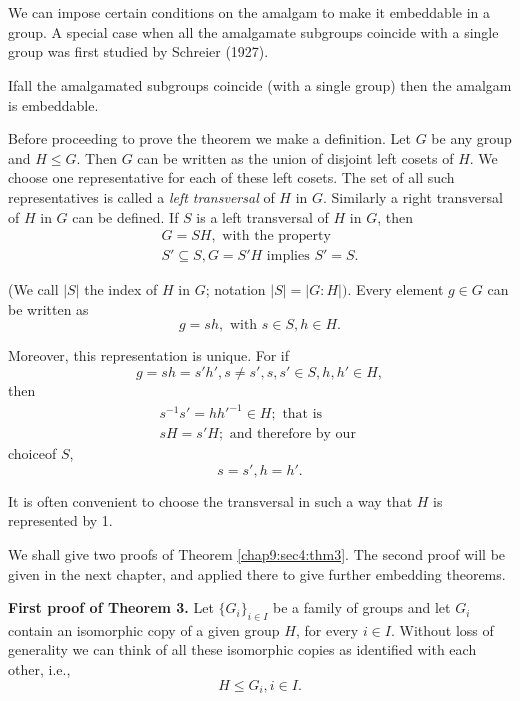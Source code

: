 \section{}\label{chap9:sec4}%

We can impose certain conditions on the amalgam to make it embeddable
in a group. A special case when all the amalgamate subgroups coincide
with a single group was first studied by Schreier (1927). 

\begin{theorem}[Schreier, 1927]\label{chap9:sec4:thm3}%
  If\pageoriginale all the amalgamated subgroups coincide (with a single group) then
  the amalgam is embeddable. 
\end{theorem}

Before proceeding to prove the theorem we make a definition. Let $G$
be any group and $H \leq G$. Then $G$ can be written as the union of
disjoint left cosets of $H$. We choose one representative for each of
these left cosets. The set of all such representatives is called a
\textit{ left transversal } of $H$ in $G$. Similarly a right
transversal of $H$ in $G$ can be defined. If $S$ is a left transversal
of $H$ in $G$, then  
\begin{gather*}
  G= SH, \text{ with the property }\\
  S' \subseteq S, G = S' H \text{ implies } S' = S.
\end{gather*}

(We call $|S|$ the index of $H$ in $G$; notation $|S| =|G :
H|)$. Every element $g \in G$ can be written as  
$$
g = sh, \text{ with } s \in S, h \in H.
$$

Moreover, this representation is unique. For if 
$$
g= sh = s'h', s \neq s', s,s' \in S, h, h' \in H,
$$
then 
\begin{gather*}
  s^{-1}s' = hh'^{-1} \in H; \text{ that is }\\
  sH= s'H; \text{ and therefore by our }
\end{gather*}
choice\pageoriginale of $S$,
$$
s = s', h = h'.
$$

It is often convenient to choose the transversal in such a way that
$H$ is represented by 1. 

We shall give two proofs of Theorem \ref{chap9:sec4:thm3}. The second proof will be
given in the next chapter, and applied there to give further embedding
theorems. 

\noindent \textbf{First proof of Theorem 3.} Let $\{ G_i \}_{i
  \in I}$ be a family of groups and let $G_i$ contain an
isomorphic copy of a given group $H$, for every $i \in
I$. Without loss of generality we can think of all these isomorphic
copies as identified with each other, i.e., 
$$
H \leq G_i, i \in I.
$$

